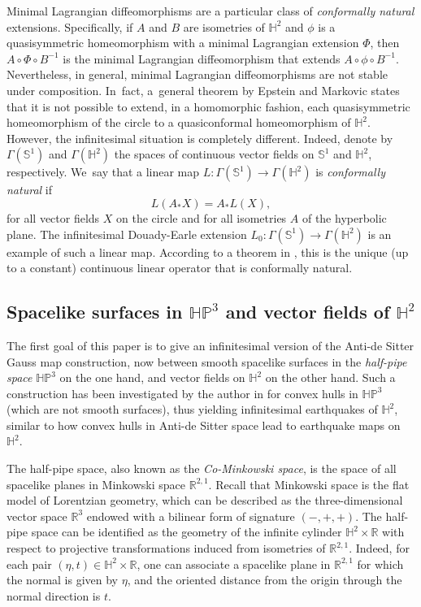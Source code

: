 \documentclass[11pt]{article}
\theoremstyle{plain}
\theoremstyle{definition}
\newcommand{\HP}{\mathbb{HP}^3}
\begin{document}
Minimal Lagrangian diffeomorphisms are a particular class of \emph{conformally natural} extensions. Specifically, if \(A\) and \(B\) are isometries of \(\mathbb{H}^2\) and \(\phi\) is a quasisymmetric homeomorphism with a minimal Lagrangian extension \(\Phi\), then \(A \circ \Phi \circ B^{-1}\) is the minimal Lagrangian diffeomorphism that extends \(A \circ \phi \circ B^{-1}\). Nevertheless, in general, minimal Lagrangian diffeomorphisms are not stable under composition. In~fact, a~general theorem by Epstein and Markovic \cite{Stopdreamingthm} states that it is not possible to extend, in a homomorphic fashion, each quasisymmetric homeomorphism of the circle to a quasiconformal homeomorphism of \(\mathbb{H}^2\). However, the infinitesimal situation is completely different. Indeed, denote by $\Gamma(\mathbb{S}^1)$ and $\Gamma(\mathbb{H}^2)$ the spaces of continuous vector fields on $\mathbb{S}^1$ and $\mathbb{H}^2$, respectively. We~say that a linear map $L: \Gamma(\mathbb{S}^1) \to \Gamma(\mathbb{H}^2)$ is \emph{conformally natural} if
\[
L(A_* X) = A_* L(X),
\]
for all vector fields $X$ on the circle and for all isometries $A$ of the hyperbolic plane. The infinitesimal Douady-Earle extension $L_0: \Gamma(\mathbb{S}^1) \to \Gamma(\mathbb{H}^2)$ is an example of such a linear map. According to a theorem in \cite{Uniqueness_of_operator_L}, this is the unique (up to a constant) continuous linear operator that is conformally natural.

\subsection{Spacelike surfaces in \texorpdfstring{$\HP$}{HP}
and vector fields of \texorpdfstring{$\mathbb{H}^2$}{H2}}

The first goal of this paper is to give an infinitesimal version of the Anti-de Sitter Gauss map construction, now between smooth spacelike surfaces in the \emph{half-pipe space} \(\HP\) on the one hand, and vector fields on \(\mathbb{H}^2\) on the other hand. Such a construction has been investigated by the author in \cite{diaf2023Infearth} for convex hulls in \(\HP\) (which are not smooth surfaces), thus yielding infinitesimal earthquakes of \(\mathbb{H}^2\), similar to how convex hulls in Anti-de Sitter space lead to earthquake maps on \(\mathbb{H}^2\).

The half-pipe space, also known as the \emph{Co-Minkowski space}, is the space of all spacelike planes in Minkowski space \(\mathbb{R}^{2,1}\). Recall that Minkowski space is the flat model of Lorentzian geometry, which can be described as the three-dimensional vector space \(\mathbb{R}^3\) endowed with a bilinear form of signature \((-,+,+)\). The half-pipe space can be identified as the geometry of the infinite cylinder \(\mathbb{H}^2 \times \mathbb{R}\) with respect to projective transformations induced from isometries of \(\mathbb{R}^{2,1}\). Indeed, for each pair \((\eta,t) \in \mathbb{H}^2 \times \mathbb{R}\), one can associate a spacelike plane in \(\mathbb{R}^{2,1}\) for which the normal is given by \(\eta\), and the oriented distance from the origin through the normal direction is \(t\).
\end{document}
